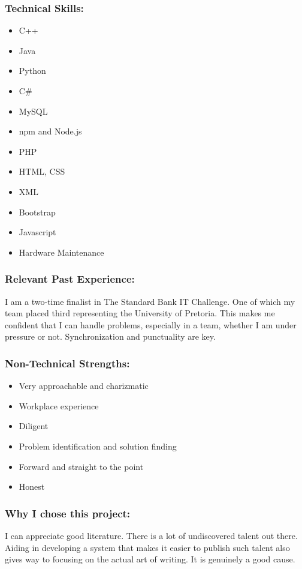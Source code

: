 \subsubsection{Technical Skills:}
\begin{itemize}
	\item C++
	\item Java
	\item Python
	\item C\#
	\item MySQL
	\item npm and Node.js
	\item PHP
	\item HTML, CSS
	\item XML
	\item Bootstrap
	\item Javascript
	\item Hardware Maintenance 
\end{itemize}


\subsubsection{Relevant Past Experience:}
\par{I am a two-time finalist in The Standard Bank IT Challenge. One of which my team placed third representing the University of Pretoria. This makes me confident that I can handle problems, especially in a team, whether I am under pressure or not. Synchronization and punctuality are key.}

\subsubsection{Non-Technical Strengths:}
\begin{itemize}
	\item Very approachable and charizmatic
	\item Workplace experience
	\item Diligent
	\item Problem identification and solution finding
	\item Forward and straight to the point
	\item Honest
\end{itemize}

\subsubsection{Why I chose this project:}
\par{I can appreciate good literature. There is a lot of undiscovered talent out there. Aiding in developing a system that makes it easier to publish such talent also gives way to focusing on the actual art of writing. It is genuinely a good cause.}

